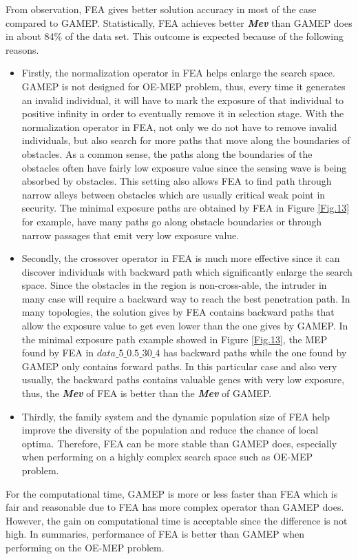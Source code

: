 \documentclass[final]{elsarticle}
\begin{document}
From observation, FEA gives better solution accuracy in most of the case compared to GAMEP. Statistically, FEA achieves better \textit{\textbf{Mev}} than GAMEP does in about 84\% of the data set. This outcome is expected because of  the following reasons.
\begin{itemize}
	\item Firstly, the normalization operator in FEA helps enlarge the search space. GAMEP is not designed for OE-MEP problem, thus, every time it generates an invalid individual, it will have to mark the exposure of that individual to positive infinity in order to eventually remove it in selection stage. With the normalization operator in FEA, not only we do not have to remove invalid individuals, but also search for more paths that move along the boundaries of obstacles. As a common sense, the paths along the boundaries of the obstacles often have fairly low exposure value since the sensing wave is being absorbed by obstacles. This setting also allows FEA to find path through narrow alleys between obstacles which are usually critical weak point in security. The minimal exposure paths are obtained by FEA in Figure \ref{Fig.13} for example, have many paths go along obstacle boundaries or through narrow passages that emit very low exposure value.
	\item Secondly, the crossover operator in FEA is much more effective since it can discover individuals with backward path which significantly enlarge the search space. Since the obstacles in the region is non-cross-able, the intruder in many case will require a backward way to reach the best penetration path. In many topologies, the solution gives by FEA contains backward paths that allow the exposure value to get even lower than the one gives by GAMEP. In the minimal exposure path example showed in Figure \ref{Fig.13}, the MEP found by FEA in $data\_5\_0.5\_30\_4 $ has backward paths while the one found by GAMEP only contains forward paths. In this particular case and also very usually, the backward paths contains valuable genes with very low exposure, thus, the \textbf{\textit{Mev}} of FEA is better than the \textbf{\textit{Mev}} of GAMEP. 
	\item Thirdly, the family system and the dynamic population size of FEA help improve the diversity of the population and reduce the chance of local optima. Therefore, FEA can be more stable than GAMEP does, especially when performing on a highly complex search space such as OE-MEP problem. 
\end{itemize}
For the computational time, GAMEP is more or less faster than FEA which is fair and reasonable due to FEA has more complex operator than GAMEP does. However, the gain on computational time is acceptable since the difference is not high. In summaries, performance of FEA is better than GAMEP when performing on the OE-MEP problem. 
\end{document}
